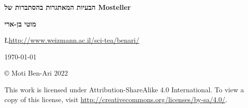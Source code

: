 


\thispagestyle{empty}

\begin{center}
\textbf{\LARGE הבעיות המאתגרות בהסתברות של Mosteller}

\bigskip
\bigskip
\bigskip

\textbf{\Large מוטי בן-ארי}

\bigskip

\L{\url{http://www.weizmann.ac.il/sci-tea/benari/}}

\bigskip
\bigskip

\today

\end{center}

\vfill

\begin{center}
\copyright{} Moti Ben-Ari $2022$
 \end{center}
 
\begin{small}
This work is licensed under Attribution-ShareAlike 4.0 International. To view a copy of this license, visit \url{http://creativecommons.org/licenses/by-sa/4.0/}.

%
%
%
%
%
%
\end{small}
\newpage


\tableofcontents

